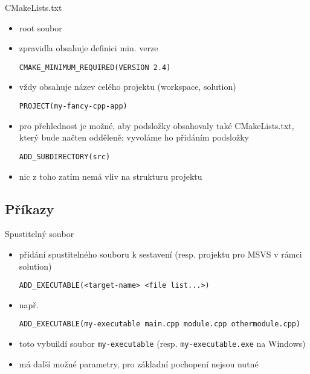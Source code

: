 \documentclass{beamer}
\begin{document}
\begin{xframe}{CMakeLists.txt}
	\begin{itemize}
		\item root soubor
		\item zpravidla obsahuje definici min. verze
\begin{lstlisting}[basicstyle=\fontsize{8}{9}\selectfont\ttfamily]
CMAKE_MINIMUM_REQUIRED(VERSION 2.4)
\end{lstlisting}
		\item vždy obsahuje název celého projektu (workspace, solution)
\begin{lstlisting}[basicstyle=\fontsize{8}{9}\selectfont\ttfamily]
PROJECT(my-fancy-cpp-app)
\end{lstlisting}
		\item pro přehlednost je možné, aby podsložky obsahovaly také CMakeLists.txt, který bude načten odděleně; vyvoláme ho přidáním podsložky
\begin{lstlisting}[basicstyle=\fontsize{8}{9}\selectfont\ttfamily]
ADD_SUBDIRECTORY(src)
\end{lstlisting}
		\item nic z toho zatím nemá vliv na strukturu projektu
	\end{itemize}
\end{xframe}

\subsection{Příkazy}

\begin{xframe}{Spustitelný soubor}
	\begin{itemize}
		\item přidání spustitelného souboru k sestavení (resp. projektu pro MSVS v rámci solution)
\begin{lstlisting}[basicstyle=\fontsize{8}{9}\selectfont\ttfamily]
ADD_EXECUTABLE(<target-name> <file list...>)
\end{lstlisting}
		\item např.
\begin{lstlisting}[basicstyle=\fontsize{8}{9}\selectfont\ttfamily]
ADD_EXECUTABLE(my-executable main.cpp module.cpp othermodule.cpp)
\end{lstlisting}
		\item toto vybuildí soubor \texttt{my-executable} (resp. \texttt{my-executable.exe} na Windows)
		\item má další možné parametry, pro základní pochopení nejsou nutné
	\end{itemize}
\end{xframe}
\end{document}
